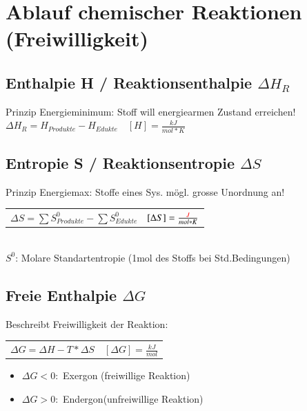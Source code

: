\section{Ablauf chemischer Reaktionen (Freiwilligkeit)}

\subsection{Enthalpie H / Reaktionsenthalpie $\Delta H_R$}
    Prinzip Energieminimum: Stoff will energiearmen Zustand erreichen!\\
    $\Delta H_R = H_{Produkte} - H_{Edukte} \quad [H] = \frac{kJ}{mol * K}$\\
    \vspace{-0.3cm}

\subsection{Entropie S / Reaktionsentropie $\Delta S$}
    Prinzip Energiemax: Stoffe eines Sys. mögl. grosse Unordnung an!\\
    \begin{tabular}{p{5.5cm}l}
        $\Delta S = \sum S^0_{Produkte} - \sum S^0_{Edukte}$ & $[\Delta S] = \frac{\color{red}J}{mol * K}$
    \end{tabular}\\
    $S^0$: Molare Standartentropie (1mol des Stoffs bei Std.Bedingungen)
\subsection{Freie Enthalpie $\Delta G$}
    Beschreibt Freiwilligkeit der Reaktion:\\
    \begin{tabular}{p{5.5cm}l}
        $\Delta G = \Delta H - T * \Delta S$ & $[\Delta G] = \frac{kJ}{mol}$
    \end{tabular}
    \begin{itemize}
        \item $\Delta G < 0:$ Exergon (freiwillige Reaktion)
        \item $\Delta G > 0:$ Endergon(unfreiwillige Reaktion)
    \end{itemize}

